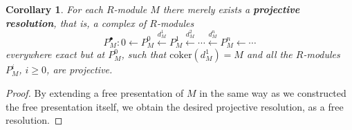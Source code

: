 \documentclass{amsart}
\theoremstyle{plain}
\numberwithin{equation}{section} %
\numberwithin{figure}{section} %
\theoremstyle{plain}
\newtheorem{cor}[thm]{Corollary} %
\theoremstyle{plain}
\theoremstyle{plain}
\theoremstyle{plain}
\newtheorem{lem}[thm]{Lemma} %
\theoremstyle{plain}
\theoremstyle{plain}
\theoremstyle{remark}
\theoremstyle{remark}
\theoremstyle{remark}
\begin{document}


\begin{cor}
For each $R$-module $M$ there merely exists a \textbf{projective resolution}, that is, a complex of $R$-modules
\[ P^\bullet_M: 0 \leftarrow P^0_M \stackrel{d_M^1}{\leftarrow} P^1_M \stackrel{d_M^2}{\leftarrow} \cdots \stackrel{d_M^n}{\leftarrow} P^n_M \leftarrow \cdots \]
everywhere exact but at $P_M^0$, such that $\mathrm{coker}(d_M^1) = M$ and all the $R$-modules $P^i_M$, $i \geq 0$, are projective.
\end{cor}
\begin{proof}
By extending a free presentation of $M$ in the same way as we constructed the free presentation itself, we obtain the desired projective resolution, as a free resolution. 
\end{proof}
\end{document}
